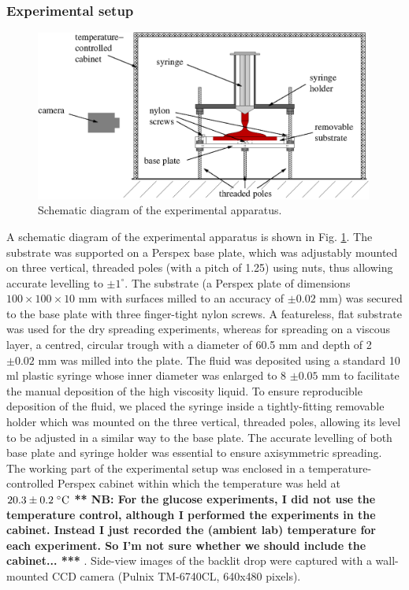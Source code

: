 \documentclass[aip,graphicx]{revtex4-1}
\begin{document}
\subsubsection{Experimental setup}
\label{sec:experimental_setup}

\begin{figure}[!h]
\centering
\includegraphics[width=0.99\textwidth]{figures/experimental_apparatus_updated.eps}
\caption{Schematic diagram of the experimental apparatus.}
\label{fig:experimental_apparatus}
\end{figure}

A schematic diagram of the experimental apparatus is
shown in Fig. \ref{fig:experimental_apparatus}. The substrate was
supported on a Perspex base plate, which was adjustably mounted on
three vertical, threaded poles (with a pitch of 1.25) using nuts, thus allowing accurate
levelling to $\pm 1^\circ$. The substrate (a Perspex plate of
dimensions $100 \times 100 \times 10$ mm with surfaces milled to an
accuracy of $\pm 0.02$ mm)
was secured to the base plate with three finger-tight nylon screws. A
featureless, flat substrate was used for the dry spreading
experiments, whereas for spreading on a viscous layer, a centred,
circular trough with a diameter of 60.5 mm and depth of 2 $\pm 0.02$ mm was milled into the plate. The fluid was deposited using a
standard 10 ml plastic syringe whose inner diameter was enlarged 
to 8 $\pm 0.05$ mm to facilitate the manual deposition of the high
viscosity liquid. To ensure reproducible deposition of the
fluid, we placed the syringe inside a tightly-fitting removable
holder which was mounted on the three vertical, threaded poles, 
allowing its level to be adjusted in a similar way to the base plate. The
accurate levelling of both base plate and syringe holder was essential
to ensure axisymmetric spreading. The working part of the experimental 
setup was enclosed in a temperature-controlled Perspex cabinet within which the 
temperature was held at $20.3 \pm 0.2 \; ^{\circ} \text{C}$ {\bf *** NB: For the glucose
  experiments, I did not use the temperature control, although I performed the
  experiments in the cabinet. Instead I just recorded the (ambient lab) temperature
  for each experiment. So I'm not sure whether we should include the
  cabinet... ***  }.
Side-view images of the backlit drop were captured with a wall-mounted 
CCD camera (Pulnix TM-6740CL, 640x480 pixels). 
\end{document}

